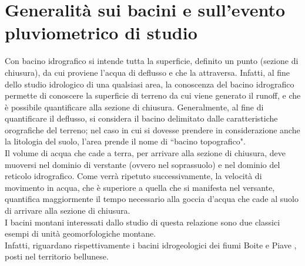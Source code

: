 \section{Generalità sui bacini e sull'evento pluviometrico di studio}
Con bacino idrografico si intende tutta la superficie, definito un punto (sezione di chiusura), da cui proviene l'acqua di deflusso e che la attraversa. Infatti, al fine dello studio idrologico di una qualsiasi area, la conoscenza del bacino idrografico permette di conoscere la superficie di terreno da cui viene generato il runoff, e che è possibile quantificare alla sezione di chiusura. Generalmente, al fine di quantificare il deflusso, si considera il bacino delimitato dalle caratteristiche orografiche del terreno; nel caso in cui si dovesse prendere in considerazione anche la litologia del suolo, l'area prende il nome di ``bacino topografico".\\
Il volume di acqua che cade a terra, per arrivare alla sezione di chiusura, deve muoversi nel dominio di verstante (ovvero nel soprassuolo) e nel dominio del reticolo idrografico. Come verrà ripetuto successivamente, la velocità di movimento in acqua, che è superiore a quella che si manifesta nel versante, quantifica maggiormente il tempo necessario alla goccia d'acqua che cade al suolo di arrivare alla sezione di chiusura.\\
I bacini montani interessati dallo studio di questa relazione sono due classici esempi di unità geomorfologiche montane.\\
Infatti, riguardano rispettivamente i bacini idrogeologici dei fiumi Boite \cite{fiume_boite} e Piave \cite{fiume_piave}, posti nel territorio bellunese.
